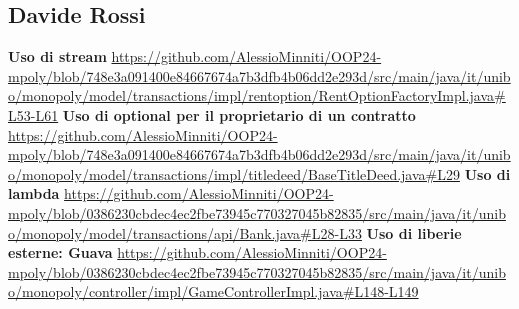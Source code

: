 \subsection{Davide Rossi}
\textbf{Uso di stream}\newline
\url{https://github.com/AlessioMinniti/OOP24-mpoly/blob/748e3a091400e84667674a7b3dfb4b06dd2e293d/src/main/java/it/unibo/monopoly/model/transactions/impl/rentoption/RentOptionFactoryImpl.java#L53-L61}\newline
\textbf{Uso di optional per il proprietario di un contratto}\newline
\url{https://github.com/AlessioMinniti/OOP24-mpoly/blob/748e3a091400e84667674a7b3dfb4b06dd2e293d/src/main/java/it/unibo/monopoly/model/transactions/impl/titledeed/BaseTitleDeed.java#L29}\newline
\textbf{Uso di lambda}\newline
\url{https://github.com/AlessioMinniti/OOP24-mpoly/blob/0386230cbdec4ec2fbe73945c770327045b82835/src/main/java/it/unibo/monopoly/model/transactions/api/Bank.java#L28-L33}\newline
\textbf{Uso di liberie esterne: Guava}
\url{https://github.com/AlessioMinniti/OOP24-mpoly/blob/0386230cbdec4ec2fbe73945c770327045b82835/src/main/java/it/unibo/monopoly/controller/impl/GameControllerImpl.java#L148-L149}\newline
